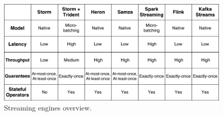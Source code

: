 %

 \begin{figure}[h!]
\includegraphics[width=1\textwidth]{images/streaming_engines.pdf}
 \caption{Streaming engines overview.}
\label{fig:streaming_engines_overview}
\end{figure}



